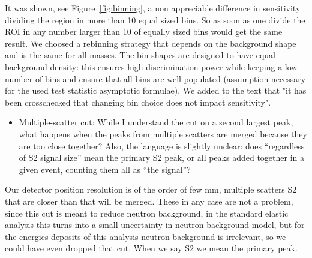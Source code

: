 \documentclass{article}
\begin{document}
It was shown, see Figure~\ref{fig:binning}, a non appreciable
difference in sensitivity dividing the region in more than 10 equal sized bins. 
So as soon as one divide the ROI in any number larger than 10 of equally sized bins would get the same result. 
We choosed a rebinning strategy that depends on the background shape and is the same for all masses. The bin shapes are designed to have
equal background density: this ensures high discrimination power while keeping a low number of bins and ensure that all bins are 
well populated (assumption necessary for the used test statistic asymptotic formulae). 
We added to the text that "it has been crosschecked that changing bin choice does not impact sensitivity".


\begin{itemize}
	\item {\color{blue} 
Multiple-scatter cut: While I understand the cut on a second largest
peak, what happens when the peaks from multiple scatters are merged
because they are too close together? Also, the language is slightly
unclear: does “regardless of S2 signal size” mean the primary S2 peak,
or all peaks added together in a given event, counting them all as
“the signal”?}
\end{itemize}

Our detector position resolution is of the order of few mm, multiple scatters S2 that are 
closer than that will be merged. These in any case are not a problem, since this cut is meant 
to reduce neutron background, in the standard elastic analysis this turns into a small
uncertainty in neutron background model, but for the energies deposits of this analysis neutron background 
is irrelevant, so we could have even dropped that cut. When we say S2 we mean the primary peak. 
\end{document}
